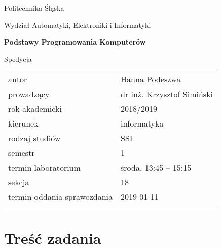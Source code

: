 \documentclass[12pt,a4paper,twoside]{article}
\newcounter{rok}
\begin{document}
\frenchspacing
\thispagestyle{empty}
\begin{center}
{\Large\sf Politechnika Śląska   %

Wydział Automatyki, Elektroniki i Informatyki

}

\vfill

 

\vfill\vfill

{\Huge\sffamily\bfseries Podstawy Programowania Komputerów\par}  

\vfill\vfill

{\LARGE\sf Spedycja}   


\vfill \vfill\vfill\vfill






\begin{tabular}{ll}
	\toprule
	autor                       & Hanna Podeszwa     \\
	prowadzący                  & dr inż. Krzysztof Simiński  \\
	rok akademicki              & 2018/2019         \\
	kierunek                    & informatyka            \\
	rodzaj studiów              & SSI                    \\
	semestr                     & 1                      \\
	termin laboratorium         & środa, 13:45 -- 15:15 \\
	sekcja                      & 18                     \\
	termin oddania sprawozdania & 2019-01-11             \\
	\bottomrule
	                            &
\end{tabular}

\end{center}

\cleardoublepage

\section{Treść zadania}
\end{document}
